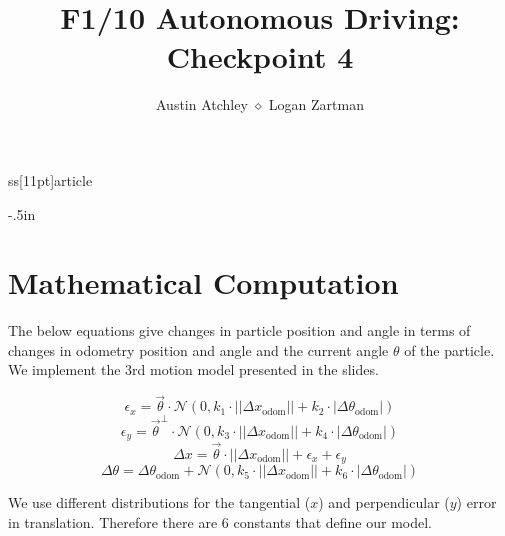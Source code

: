 ss[11pt]{article}

\usepackage{amssymb}
\usepackage{tikz}
\usepackage{hyperref}

\newcommand{\numpy}{{\tt numpy}}    %
\newcommand{\comment}[1]{}

\topmargin -.5in
\textheight 9in
\oddsidemargin 0in
\evensidemargin 0in
\textwidth 6.5in



\author{Austin Atchley $\diamond$ Logan Zartman}
\title{\bf{F1/10 Autonomous Driving: Checkpoint 4}}
\maketitle

\medskip


\section{Mathematical Computation} \label{comp}
The below equations give changes in particle position and angle in terms of changes in odometry position and angle and the current angle $\theta$ of the particle. We implement the 3rd motion model presented in the slides.

\begin{equation}
    \epsilon_x = \overrightarrow{\theta} \cdot \mathcal{N}(0, k_1 \cdot || \Delta x_{\text{odom}} || + k_2 \cdot | \Delta \theta_{\text{odom}} |)
\end{equation}
\begin{equation}
    \epsilon_y = \overrightarrow{\theta}^{\perp} \cdot \mathcal{N}(0, k_3 \cdot || \Delta x_{\text{odom}} || + k_4 \cdot | \Delta \theta_{\text{odom}} |)
\end{equation}
\begin{equation}
    \Delta x = \overrightarrow{\theta} \cdot || \Delta x_{\text{odom}} ||
    + \epsilon_x + \epsilon_y
\end{equation}
\begin{equation}
    \Delta \theta = \Delta \theta_{\text{odom}} + \mathcal{N}(0, k_5 \cdot || \Delta x_{\text{odom}} || + k_6 \cdot | \Delta \theta_{\text{odom}} |)
\end{equation}

We use different distributions for the tangential ($x$) and perpendicular ($y$) error in translation. Therefore there are 6 constants that define our model.


